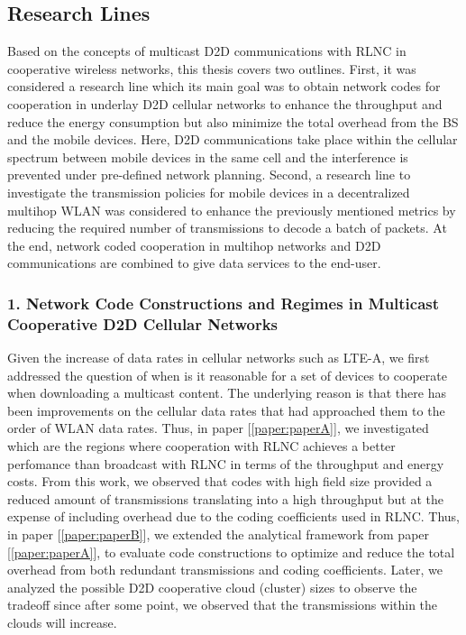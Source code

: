 \subsection{Research Lines}

Based on the concepts of multicast \ac{D2D} communications with \ac{RLNC} in cooperative wireless networks, this thesis covers two outlines. First, it was considered a research line which its main goal was to obtain network codes for cooperation in underlay \ac{D2D} cellular networks to enhance the throughput and reduce the energy consumption but also minimize the total overhead from the \ac{BS} and the mobile devices. Here, \ac{D2D} communications take place within the cellular spectrum between mobile devices in the same cell and the interference is prevented under pre-defined network planning. Second, a research line to investigate the transmission policies for mobile devices in a decentralized multihop \ac{WLAN} was considered to enhance the previously mentioned metrics by reducing the required number of transmissions to decode a batch of packets. At the end, network coded cooperation in multihop networks and \ac{D2D} communications are combined to give data services to the end-user.

\subsubsection{1. Network Code Constructions and Regimes in Multicast Cooperative D2D Cellular Networks}

Given the increase of data rates in cellular networks such as \ac{LTE-A}, we first addressed the question of when is it reasonable for a set of devices to cooperate when downloading a multicast content. The underlying reason is that there has been improvements on the cellular data rates that had approached them to the order of \ac{WLAN} data rates. Thus, in paper {[\ref{paper:paperA}]}, we investigated which are the regions where cooperation with \ac{RLNC} achieves a better perfomance than broadcast with \ac{RLNC} in terms of the throughput and energy costs. From this work, we observed that codes with high field size provided a reduced amount of transmissions translating into a high throughput but at the expense of including overhead due to the coding coefficients used in \ac{RLNC}. Thus, in paper {[\ref{paper:paperB}]}, we extended the analytical framework from paper {[\ref{paper:paperA}]}, to evaluate code constructions to optimize and reduce the total overhead from both redundant transmissions and coding coefficients. Later, we analyzed the possible \ac{D2D} cooperative cloud (cluster) sizes to observe the tradeoff since after some point, we observed that the transmissions within the clouds will increase.

